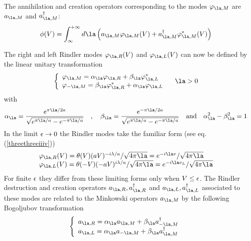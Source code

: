The  annihilation and creation operators corresponding to
the modes $ \varphi_{\la,M}$ are $a_{\la,M}$ and $a_{\la,M}^\dagger $:
\begin{equation} \phi(V) =\int_{\infty}^{+\infty} d\la \left( a_{\la,M}
\varphi_{\la,M}(V) + a_{\la,M}^{\dagger} \varphi^*_{\la,M}
(V)\right)
 \end{equation}

The right and left Rindler modes  $\varphi_{\la,R} (V)$ and $\varphi_{\la,L}
(V)$ can now be defined by the linear unitary
transformation
\begin{equation}
\left\{
\begin{array}{ll} \varphi_{\la , M} = \alpha_{\la} \varphi_{\la,R} +
\beta_{\la} \varphi_{\la,L}^* \\ \varphi_{- \la , M} = \beta_{\la}
\varphi_{\la,R}^* + \alpha_{\la} \varphi_{\la,L} \label{threethreeix}
\end{array} \right. \quad \la>0 \label{threethreex} \end{equation}
with
\begin{equation}  \alpha_{\la} = { e^{\pi \la / 2 a} \over \sqrt { e^{\pi \la
/ a} - e^{- \pi \la / a}}} \quad , \quad
 \beta_{\la} =  { e^{-\pi \la / 2 a} \over
\sqrt { e^{\pi \la / a} - e^{- \pi \la / a}}}
\quad \mbox{and} \quad \alpha_{\la}^2 -
\beta_{\la}^2 = 1 \label{threethreexi}
\end{equation}
In the limit $\mbox{$ \epsilon $} \rightarrow 0$ the
Rindler modes take the familiar form (see eq. (\ref{threethreeiiiv}))
\begin{equation} \begin{array}{ll} \varphi_{\la,R} (V) =
\theta(V) (aV)^{-i\lambda/a} /{ \sqrt{4 \pi \la}}
 =
 e^{-i\la v}/\sqrt{4 \pi \la} \\ \varphi_{\la,L} (V) =
\theta(-V) (-aV)^{i\lambda/a}/{ \sqrt{4 \pi \la}} =
 e^{-i\la v_L}/\sqrt{4 \pi \la}
\end{array}
\label{threethreexii} \end{equation}
For finite $\mbox{$ \epsilon $}$ they differ from these
limiting forms only
when $V \leq \mbox{$ \epsilon $}$.
The Rindler destruction and creation operators $a_{\la,R},
a_{\la,R}^\dagger $ and $a_{\la,L}, a_{\la,L}^\dagger $
associated to these modes are related to the Minkowski operators $a_{\la,M}$
by the following Bogoljubov transformation
\begin{equation}
\left\{
\begin{array}{ll}
a_{\la,R}  = \alpha_{\la} a_{\la,M} + \beta_{\la} a_{-\la,M}^{\dagger}\\
a_{\la,L} = \alpha_{\la} a_{-\la,M} + \beta_{\la}
a_{\la,M}^{\dagger}\label{threethreeixbog} \end{array} \right.\end{equation}
